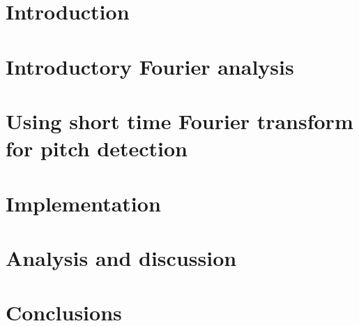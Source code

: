 \documentclass[a4paper,12pt]{article}
\begin{document}

\renewcommand{\cftsecfont}{\fontfamily{comfortaa}\selectfont}

\renewcommand{\cftsubsecfont}{\fontfamily{comfortaa}\selectfont}
\renewcommand{\cftsubsubsecfont}{\fontfamily{comfortaa}\selectfont}
\renewcommand{\contentsname}{\fontfamily{comfortaa}\selectfont Table of Contents}



\setcounter{tocdepth}{2}
\tableofcontents    

\section{Introduction}
 

\section{Introductory Fourier analysis}
 


\section{ Using short time Fourier transform for pitch detection}

\section{Implementation}

\section{Analysis and discussion}


\section{Conclusions}



\end{document}
